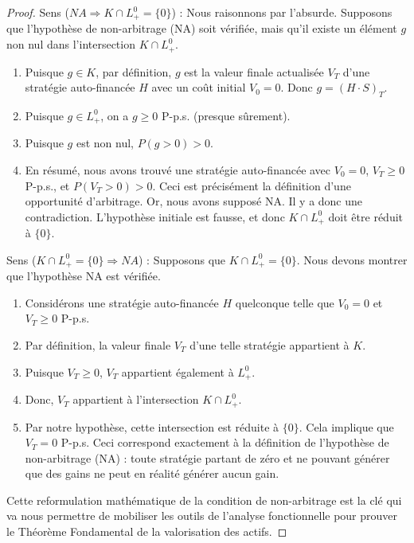 \begin{proof}
Sens ($NA \Rightarrow K \cap L^0_+ = \{0\}$) : Nous raisonnons par l'absurde. Supposons que l'hypothèse de non-arbitrage (NA) soit vérifiée, mais qu'il existe un élément $g$ non nul dans l'intersection $K \cap L^0_+$.
\begin{enumerate}
    \item Puisque $g \in K$, par définition, $g$ est la valeur finale actualisée $V_T$ d'une stratégie auto-financée $H$ avec un coût initial $V_0 = 0$. Donc $g = (H \cdot S)_T$.
    \item Puisque $g \in L^0_+$, on a $g \ge 0$ P-p.s. (presque sûrement).
    \item Puisque $g$ est non nul, $P(g > 0) > 0$.
    \item En résumé, nous avons trouvé une stratégie auto-financée avec $V_0 = 0$, $V_T \ge 0$ P-p.s., et $P(V_T > 0) > 0$. Ceci est précisément la définition d'une opportunité d'arbitrage. Or, nous avons supposé NA. Il y a donc une contradiction. L'hypothèse initiale est fausse, et donc $K \cap L^0_+$ doit être réduit à $\{0\}$.
\end{enumerate}

Sens ($K \cap L^0_+ = \{0\} \Rightarrow NA$) : Supposons que $K \cap L^0_+ = \{0\}$. Nous devons montrer que l'hypothèse NA est vérifiée.
\begin{enumerate}
    \item Considérons une stratégie auto-financée $H$ quelconque telle que $V_0 = 0$ et $V_T \ge 0$ P-p.s.
    \item Par définition, la valeur finale $V_T$ d'une telle stratégie appartient à $K$.
    \item Puisque $V_T \ge 0$, $V_T$ appartient également à $L^0_+$.
    \item Donc, $V_T$ appartient à l'intersection $K \cap L^0_+$.
    \item Par notre hypothèse, cette intersection est réduite à $\{0\}$. Cela implique que $V_T = 0$ P-p.s. Ceci correspond exactement à la définition de l'hypothèse de non-arbitrage (NA) : toute stratégie partant de zéro et ne pouvant générer que des gains ne peut en réalité générer aucun gain.
\end{enumerate}

Cette reformulation mathématique de la condition de non-arbitrage est la clé qui va nous permettre de mobiliser les outils de l'analyse fonctionnelle pour prouver le Théorème Fondamental de la valorisation des actifs.
\end{proof}

